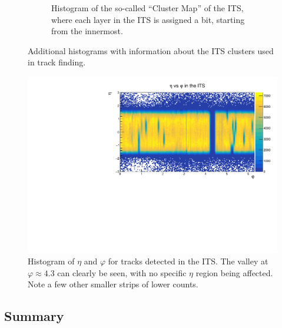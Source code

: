 \begin{figure}[h]
\begin{subfigure}[t]{.49\linewidth}
        \caption{Histogram of the so-called ``Cluster Map'' of the ITS, where each layer in the ITS is assigned a bit, starting from the innermost.}
        \label{fig:ITS_ClusterMap}
    \end{subfigure}
\caption{Additional histograms with information about the ITS clusters used in track finding.}
\label{fig:ITS_Clusters}
\end{figure}



\begin{figure}[H]
    \begin{center}
        \includegraphics[width=.8\textwidth]{Plots/pass4_TracksIU/eta_phi.pdf}
        \caption{Histogram of $\eta$ and $\varphi$ for tracks detected in the ITS. The valley at $\varphi\approx 4.3$ can clearly be seen, with no specific $\eta$ region being affected. Note a few other smaller strips of lower counts.}
        \label{fig:ITS_eta_phi}
    \end{center}
\end{figure}



\subsection{Summary}